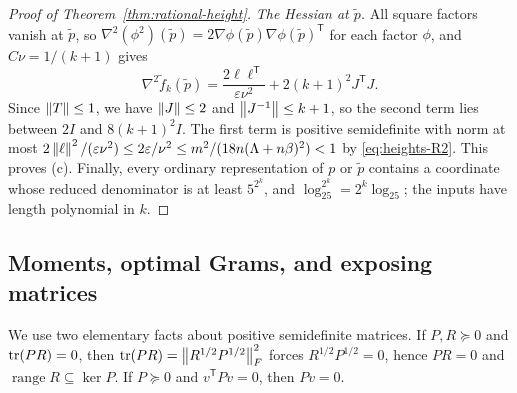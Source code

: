 \begin{proof}[Proof of Theorem~\ref{thm:rational-height}]
\emph{The Hessian at $\tilde p$.} All square factors vanish at $\tilde p$, so
$\nabla^2(\phi^2)(\tilde p)=2\nabla\phi(\tilde p)\nabla\phi(\tilde p)^{\mathsf T}$
for each factor $\phi$, and $C\nu=1/(k+1)$ gives
\[
 \nabla^2\tilde f_k(\tilde p)=\frac{2\ell\ell^{\mathsf T}}{\varepsilon\nu^2}
   +2(k+1)^2J^{\mathsf T}J .
\]
Since $\left\lVert T\right\rVert\le1$, we have $\left\lVert J\right\rVert\le2$ and $\left\lVert J^{-1}\right\rVert\le k+1$, so the
second term lies between $2I$ and $8(k+1)^2I$. The first term is positive
semidefinite with norm at most
$2\left\lVert\ell\right\rVert^2/(\varepsilon\nu^2)\le2\varepsilon/\nu^2
\le m^2/(18n(\Lambda+n\beta)^2)<1$ by \eqref{eq:heights-R2}. This proves (c).
Finally, every ordinary representation of $p$ or $\tilde p$ contains a
coordinate whose reduced denominator is at least $5^{2^k}$, and
$\log_25^{2^k}=2^k\log_25$; the inputs have length polynomial in $k$.
\end{proof}

\subsection{Moments, optimal Grams, and exposing matrices}
\label{app:heights-moment}

We use two elementary facts about positive semidefinite matrices. If
$P,R\succeq0$ and $\operatorname{tr}(PR)=0$, then
$\operatorname{tr}(PR)=\left\lVert R^{1/2}P^{1/2}\right\rVert_F^2$ forces $R^{1/2}P^{1/2}=0$, hence $PR=0$
and $\operatorname{range}R\subseteq\ker P$. If $P\succeq0$ and
$v^{\mathsf T}Pv=0$, then $Pv=0$.

